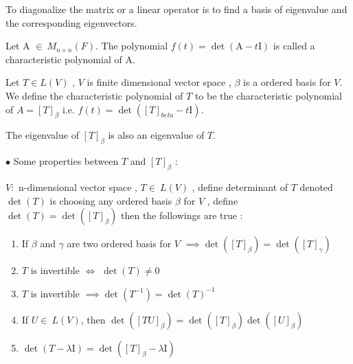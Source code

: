 		\begin{warn}[Notice :]
		To diagonalize the matrix or a linear operator is to find a basis of eigenvalue and the corresponding eigenvectors.	
		\end{warn}
		
		\begin{example}
			
		\end{example}
		\begin{defn}
			Let A $\in~M_{n\times n}(F)$. The polynomial $f(t) = \det\left(\mathrm{A}-t\mathrm{I}\right)$ is called a characteristic polynomial of A.
		\end{defn}
		\begin{defn}
			Let $T \in L(V)$ , $V$ is finite dimensional vector space , $\beta$ is a ordered basis for $V$. We define the characteristic polynomial of $T$ to be the characteristic polynomial of $A = [T]_{\beta}$ i.e. $f(t) = \det \left([T]_{beta} - t\mathrm{I}\right)$.
		\end{defn}
		
		\begin{rmk}
			The eigenvalue of $[T]_{\beta}$ is also an eigenvalue of $T$.
		\end{rmk}
		
			
		\noindent $\bullet$ Some properties between $T$ and $[T]_{\beta}$ :
		
		\noindent $V :$ n-dimensional vector space , $T\in~L(V)$ , define determinant of $T$ denoted $\det(T)$ is choosing any ordered basis $\beta$ for $V$ , define $\det(T) = \det([T]_{\beta})$ then the followings are true :  
			\begin{enumerate}
				\item If $\beta$ and $\gamma$ are two ordered basis for $V$ $\implies \det([T]_{\beta}) = \det([T]_{\gamma})$
				\item $T$ is invertible $\Leftrightarrow$ $\det(T) \neq 0$
				\item $T$ is invertible $\implies \det(T^{-1}) = \det(T)^{-1}$
				\item If $U \in~L(V)$, then $\det\left([TU]_{\beta}\right) = \det\left([T]_{\beta}\right)\det\left([U]_{\beta}\right)$
				\item $\det(T-\lambda\mathrm{I}) = \det\left([T]_{\beta}-\lambda\mathrm{I}\right)$
			\end{enumerate}
			
		
